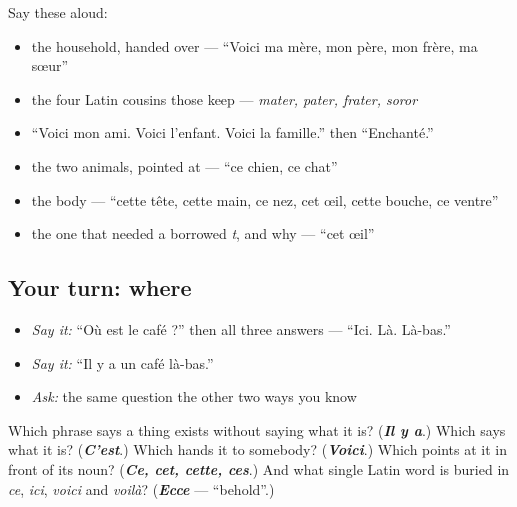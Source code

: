 Say these aloud:

\begin{itemize}
\raggedright
  \item the household, handed over — \textquotedblleft{}Voici ma mère, mon père, mon frère, ma sœur\textquotedblright{}
  \item the four Latin cousins those keep — \emph{mater, pater, frater, soror}
  \item \textquotedblleft{}Voici mon ami. Voici l'enfant. Voici la famille.\textquotedblright{} then \textquotedblleft{}Enchanté.\textquotedblright{}
  \item the two animals, pointed at — \textquotedblleft{}ce chien, ce chat\textquotedblright{}
  \item the body — \textquotedblleft{}cette tête, cette main, ce nez, cet œil, cette bouche, ce ventre\textquotedblright{}
  \item the one that needed a borrowed \emph{t}, and why — \textquotedblleft{}cet œil\textquotedblright{}
\end{itemize}

\subsection*{Your turn: where}
\begin{itemize}
\raggedright
  \item \emph{Say it:} \textquotedblleft{}Où est le café ?\textquotedblright{} then all three answers — \textquotedblleft{}Ici. Là. Là-bas.\textquotedblright{}
  \item \emph{Say it:} \textquotedblleft{}Il y a un café là-bas.\textquotedblright{}
  \item \emph{Ask:} the same question the other two ways you know
\end{itemize}

\begin{tcolorbox}[breakable,colback=teal!4,colframe=teal!35!black,title={Before you move on}]
Which phrase says a thing exists without saying what it is? (\emph{\textbf{Il y a}}.) Which says what it is? (\emph{\textbf{C'est}}.) Which hands it to somebody? (\emph{\textbf{Voici}}.) Which points at it in front of its noun? (\emph{\textbf{Ce, cet, cette, ces}}.) And what single Latin word is buried in \emph{ce}, \emph{ici}, \emph{voici} and \emph{voilà}? (\emph{\textbf{Ecce}} — \textquotedblleft{}behold\textquotedblright{}.)
\end{tcolorbox}
